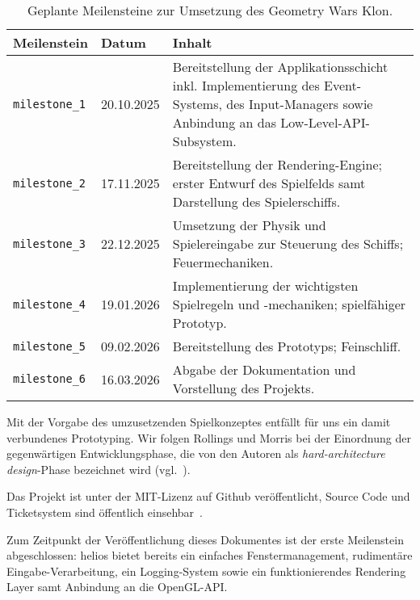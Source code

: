 \setlength{\tabcolsep}{8pt}
\begin{table}[t]
    \centering
    {\renewcommand{\arraystretch}{1.2}%
    \begin{tabularx}{\textwidth}{@{} l l Y @{}}
        \toprule
        \textbf{Meilenstein} & \textbf{Datum} & \textbf{Inhalt} \\
        \midrule
        \texttt{milestone\_1} & 20.10.2025 &
        Bereitstellung der Applikationsschicht inkl. Implementierung des Event-Systems,
        des Input-Managers sowie Anbindung an das Low-Level-API-Subsystem. \\
        \texttt{milestone\_2} & 17.11.2025 &
        Bereitstellung der Rendering-Engine; erster Entwurf des Spielfelds samt Darstellung des Spielerschiffs. \\
        \texttt{milestone\_3} & 22.12.2025 &
        Umsetzung der Physik und Spielereingabe zur Steuerung des Schiffs; Feuermechaniken. \\
        \texttt{milestone\_4} & 19.01.2026 &
        Implementierung der wichtigsten Spielregeln und -mechaniken; spielfähiger Prototyp. \\
        \texttt{milestone\_5} & 09.02.2026 &
        Bereitstellung des Prototyps; Feinschliff. \\
        \texttt{milestone\_6} & 16.03.2026 &
        Abgabe der Dokumentation und Vorstellung des Projekts. \\
        \bottomrule
    \end{tabularx}}
    \caption{Geplante Meilensteine zur Umsetzung des Geometry Wars Klon.}
    \label{tab:zeitplan}
\end{table}



\noindent
Mit der Vorgabe des umzusetzenden Spielkonzeptes entfällt für uns ein damit verbundenes Prototyping.
Wir folgen Rollings und Morris bei der Einordnung der gegenwärtigen Entwicklungsphase, die von den Autoren als \textit{hard-architecture design}-Phase bezeichnet wird (vgl.~\cite[628]{RM04}).\par

Das Projekt ist unter der MIT-Lizenz  auf Github veröffentlicht, Source Code und Ticketsystem sind öffentlich einsehbar~\cite[]{heliosgithub}.\par

Zum Zeitpunkt der Veröffentlichung dieses Dokumentes ist der erste Meilenstein abgeschlossen: helios bietet bereits ein einfaches Fenstermanagement, rudimentäre Eingabe-Verarbeitung, ein Logging-System sowie ein funktionierendes Rendering Layer samt Anbindung an die OpenGL-API.

